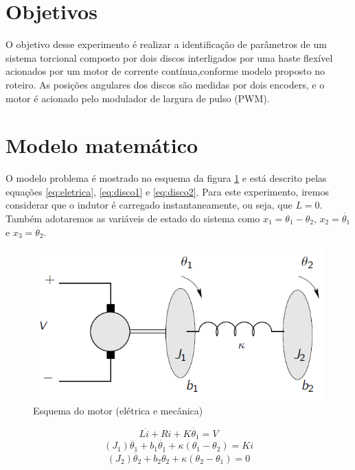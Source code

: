 \documentclass{article}
\begin{document}


\onehalfspacing
\section{Objetivos} 
O objetivo desse experimento é realizar a identificação de parâmetros de um sistema torcional composto por dois discos interligados por uma haste flexível acionados por um motor de corrente contínua,conforme modelo proposto no roteiro\cite{bb:roteiro}. As posições angulares dos discos são medidas por dois encoders, e o motor é acionado pelo modulador de largura de pulso (PWM).
	
\section{Modelo matemático}
O modelo problema é mostrado no esquema da figura \ref{fig:esqmotor} e está descrito pelas equações \ref{eq:eletrica}, \ref{eq:disco1} e \ref{eq:disco2}. Para este experimento, iremos considerar que o indutor é carregado instantaneamente, ou seja, que $L=0$. Também adotaremos as variáveis de estado do sistema como $x_1=\theta_1-\theta_2$, $x_2=\dot{\theta_1}$ e $x_3=\dot{\theta_2}$.

\begin{figure}[H]
	\centering
	\includegraphics[width=0.8\linewidth]{esqmotor}
	\caption{Esquema do motor (elétrica e mecânica)}
	\label{fig:esqmotor}
\end{figure}

\begin{equation}
\label{eq:eletrica}
L\dot{i}+Ri+K\dot{\theta_1}=V
\end{equation}
\begin{equation}
\label{eq:disco1}
(J_1)\ddot{\theta_1}+b_1\dot{\theta_1}+\kappa(\theta_1-\theta_2)=Ki
\end{equation}
\begin{equation}
\label{eq:disco2}
(J_2)\ddot{\theta_2}+b_2\dot{\theta_2}+\kappa(\theta_2-\theta_1)=0
\end{equation}
\end{document}
